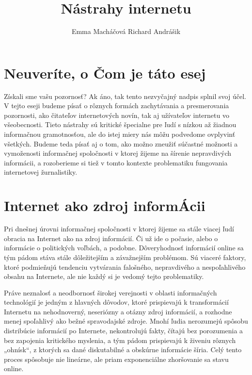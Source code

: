 \documentclass{sig-alternate}
\begin{document}
\title{Nástrahy internetu}

\author{
\alignauthor
Emma Macháčová
\alignauthor
Richard Andrášik
}
\maketitle
\section{Neuveríte, o Čom je táto esej}
Získali sme vašu pozornosť? Ak áno, tak tento nezvyčajný nadpis splnil svoj účel. V tejto eseji budeme písať o rôznych formách zachytávania a presmerovania pozornosti, ako čitateľov internetových novín, tak aj užívateľov internetu vo všeobecnosti. Tieto nástrahy sú kritické špecialne pre ľudí s nízkou až žiadnou informačnou gramotnosťou, ale do istej miery nás môžu podvedome ovplyvinť všetkých. Budeme teda písať aj o tom, ako možno zneužiť súčastné možnosti a vymoženosti informačnej spoločnosti v ktorej žijeme na šírenie nepravdivých informácii, a rozoberieme si tiež v tomto kontexte problematiku fungovania internetovej žurnalistiky.
\section{Internet ako zdroj informÁcii}
Pri dnešnej úrovni informačnej spoločnosti v ktorej žijeme sa stále viacej ľudí obracia na Internet ako na zdroj informácií. Či už ide o počasie, alebo o informácie o politických voľbách, a podobne. Dôveryhodnosť informácií online sa tým pádom stáva stále dôležitejším a závažnejším problémom. Sú viaceré faktory, ktoré podmieňujú tendenciu vytvárania falošného, nepravdivého a nespoľahlivého obsahu na Internete, ale nie každý si je vedomý tejto problematiky.

Práve neznalosť a neodbornosť širokej verejnosti v oblasti informačných technológií je jedným z hlavných dôvodov, ktoré prispievajú  k transformácií Internetu na nehodnoverný, neseriózny a otázny zdroj informácií, a rozhodne menej spoľahlivý ako bežné spravodajské zdroje. Mnohí ľudia nerozumejú spôsobu distribúcie informácií po Internete, nekontrolujú fakty, čítajú bez porozumenia a bez zapojenia kritického myslenia, a tým pádom prispievajú k živeniu rôznych  „ohnísk“, z ktorých sa dané diskutabilné a obskúrne informácie šíria. Celý tento proces spôsobuje nie lineárne, ale priam exponenciálne zhoršovanie sa stavu online.
\end{document}
